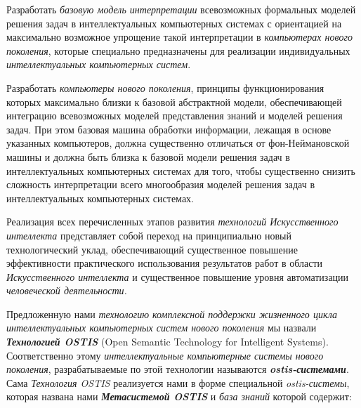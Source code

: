 \begin{textitemize}
	\item 
	Разработать \textit{базовую модель интерпретации} всевозможных формальных моделей решения задач в интеллектуальных компьютерных системах с ориентацией на максимально возможное упрощение такой интерпретации в \textit{компьютерах нового поколения}, которые специально предназначены для реализации индивидуальных \textit{интеллектуальных компьютерных систем}.
	\item 
	Разработать \textit{компьютеры нового поколения}, принципы функционирования которых максимально близки к базовой абстрактной модели, обеспечивающей интеграцию всевозможных моделей представления знаний и моделей решения задач. При этом базовая машина обработки информации, лежащая в основе указанных компьютеров, должна существенно отличаться от фон-Неймановской машины и должна быть близка к базовой модели решения задач в интеллектуальных компьютерных системах для того, чтобы существенно снизить сложность интерпретации всего многообразия моделей решения задач в интеллектуальных компьютерных системах.
\end{textitemize}

Реализация всех перечисленных этапов развития \textit{технологий Искусственного интеллекта} представляет собой переход на принципиально новый технологический уклад, обеспечивающий существенное повышение эффективности практического использования результатов работ в области \textit{Искусственного интеллекта} и существенное повышение уровня автоматизации \textit{человеческой деятельности.}

Предложенную нами \textit{технологию комплексной поддержки жизненного цикла интеллектуальных компьютерных систем нового поколения} мы назвали \textbf{\textit{Технологией OSTIS}} (Open Semantic Technology for Intelligent Systems). Соответственно этому \textit{интеллектуальные компьютерные системы нового поколения}, разрабатываемые по этой технологии называются \textbf{\textit{ostis-системами}}. Сама \textit{Технология OSTIS} реализуется нами в форме специальной \textit{ostis-системы}, которая названа нами \textbf{\textit{Метасистемой OSTIS}} и \textit{база знаний} которой содержит:

